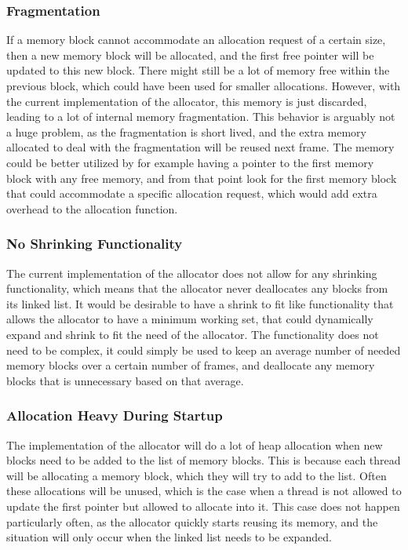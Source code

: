 \subsubsection{Fragmentation}
If a memory block cannot accommodate an allocation request of a certain size, then a new memory block will be allocated, and the first free pointer will be updated to this new block.
There might still be a lot of memory free within the previous block, which could have been used for smaller allocations.
However, with the current implementation of the allocator, this memory is just discarded, leading to a lot of internal memory fragmentation.
This behavior is arguably not a huge problem, as the fragmentation is short lived, and the extra memory allocated to deal with the fragmentation
will be reused next frame.
The memory could be better utilized by for example having a pointer to the first memory block with any free memory, and from that point look for the first memory block that could accommodate a specific allocation request, which would add extra overhead to the allocation function.

\subsubsection{No Shrinking Functionality}
The current implementation of the allocator does not allow for any shrinking functionality, which means that the allocator never deallocates any blocks from its linked list.
It would be desirable to have a shrink to fit like functionality that allows the allocator to have a minimum working set, that could dynamically expand and shrink to fit the need of the allocator.
The functionality does not need to be complex, it could simply be used to keep an average number of needed memory blocks over a certain number of frames, and deallocate any memory blocks that is unnecessary based on that average.

\subsubsection{Allocation Heavy During Startup}
The implementation of the allocator will do a lot of heap allocation when new blocks need to be added to the list of memory blocks.
This is because each thread will be allocating a memory block, which they will try to add to the list.
Often these allocations will be unused, which is the case when a thread is not allowed to update the first pointer but allowed to allocate into it.
This case does not happen particularly often, as the allocator quickly starts reusing its memory, and the situation will only occur when
the linked list needs to be expanded.

